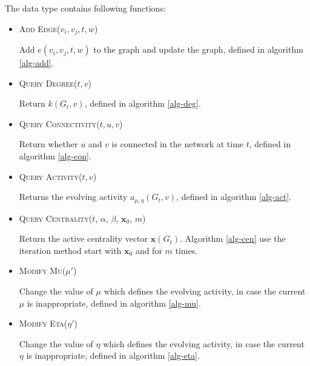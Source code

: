 \documentclass[12pt,abstract=true]{scrartcl}
\numberwithin{equation}{section}
\theoremstyle{definition}   \newtheorem{definition}{Definition}[section]
\theoremstyle{plain}        \newtheorem{theorem}{Theorem}[section]
\theoremstyle{plain}        \newtheorem{observation}{Observation}[section]
\theoremstyle{plain}        \newtheorem{fact}{Fact}[section]
\theoremstyle{plain}        \newtheorem{claim}{Claim}[section]
\theoremstyle{plain}        \newtheorem{lemma}[theorem]{Lemma}
\theoremstyle{plain}        \newtheorem{corollary}[theorem]{Corollary}
\theoremstyle{remark}       \newtheorem{example}{Example}[section]
\theoremstyle{remark}       \newtheorem{remark}{Remark}[section]
\begin{document}
The data type contains following functions:
\begin{itemize}
\item \textsc{Add Edge}($v_i,v_j,t,w$)

Add $e(v_i,v_j,t,w)$ to the graph and update the graph,
defined in algorithm \ref{alg-add}.
\item \textsc{Query Degree}($t,v$)

Return $k(G_t,v)$, defined in algorithm \ref{alg-deg}.
\item \textsc{Query Connectivity}($t,u,v$)

Return whether $u$ and $v$ is connected in the network at time $t$, defined in
algorithm \ref{alg-con}.

\item \textsc{Query Activity}($t,v$)

Returns the evolving activity $a_{\mu,\eta}(G_t,v)$, defined in algorithm
\ref{alg-act}.

\item \textsc{Query Centrality}($t$, $\alpha$, $\beta$, $\mathbf{x}_0$, $m$)

Return the active centrality vector $\mathbf{x}(G_t)$. Algorithm \ref{alg-cen}
use the iteration method start with $\mathbf{x}_0$ and for $m$ times.

\item \textsc{Modify Mu}($\mu'$)

Change the value of $\mu$ which defines the evolving activity, in case the
current $\mu$ is inappropriate, defined in algorithm \ref{alg-mu}.

\item \textsc{Modify Eta}($\eta'$)

Change the value of $\eta$ which defines the evolving activity, in case the
current $\eta$ is inappropriate, defined in algorithm \ref{alg-eta}.
\end{itemize}
\end{document}
